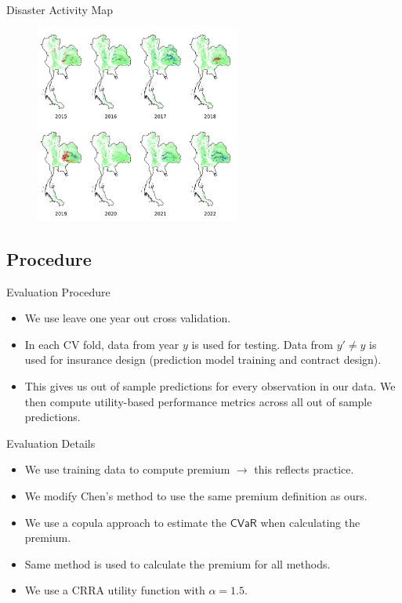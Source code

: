 \documentclass{beamer}
\begin{document}
\begin{frame}{Disaster Activity Map}
    \begin{figure}[h]
        \centering
        \includegraphics[width=0.6\textwidth]{disaster_map.png}
    \end{figure}
\end{frame}

\subsection{Procedure}
\begin{frame}{Evaluation Procedure}
    \begin{itemize}
        \setlength\itemsep{2em}
        \item We use leave one year out cross validation. 
        \item In each CV fold, data from year $y$ is used for testing. Data from $y'\neq y$ is used for insurance design (prediction model training and contract design).
        \item This gives us out of sample predictions for every observation in our data. We then compute utility-based performance metrics across all out of sample predictions. 
    \end{itemize}
\end{frame}

\begin{frame}{Evaluation Details}
    \begin{itemize}
        \item We use training data to compute premium $\rightarrow$ this reflects practice.
        \item We modify Chen's method to use the same premium definition as ours. 
        \item We use a copula approach to estimate the $\textsf{CVaR}$ when calculating the premium. 
        \item Same method is used to calculate the premium for all methods. 
        \item We use a CRRA utility function with $\alpha=1.5$. 
    \end{itemize}
    
\end{frame}
\end{document}
